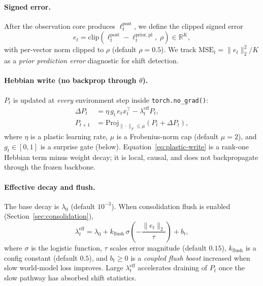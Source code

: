 \paragraph{Signed error.}
After the observation core produces $\ell^{\mathrm{post}}_t$, we define the clipped signed error
\begin{equation}
  e_t = \mathrm{clip}\!\left(\ell^{\mathrm{post}}_t - \ell^{\mathrm{prior,pl}}_t,\; \rho\right) \in \mathbb{R}^{K},
  \label{eq:signed-error}
\end{equation}
with per-vector norm clipped to $\rho$ (default $\rho=0.5$).
We track $\mathrm{MSE}_t = \|e_t\|_2^2 / K$ as a \emph{prior prediction error} diagnostic for shift detection.

\paragraph{Hebbian write (no backprop through $\theta$).}
$P_t$ is updated at \emph{every} environment step inside \texttt{torch.no\_grad()}:
\begin{align}
  \Delta P_t &= \eta \, g_t \, e_t x_t^\top - \lambda^{\mathrm{eff}}_t P_t,
  \label{eq:plastic-write}\\
  P_{t+1} &= \mathrm{Proj}_{\|\cdot\|_F \le \mu}\!\left(P_t + \Delta P_t\right),
  \label{eq:plastic-proj}
\end{align}
where $\eta$ is a plastic learning rate, $\mu$ is a Frobenius-norm cap (default $\mu=2$), and $g_t \in [0,1]$ is a surprise gate (below).
Equation~\eqref{eq:plastic-write} is a rank-one Hebbian term minus weight decay; it is local, causal, and does not backpropagate through the frozen backbone.

\paragraph{Effective decay and flush.}
The base decay is $\lambda_0$ (default $10^{-3}$).
When consolidation flush is enabled (Section~\ref{sec:consolidation}),
\begin{equation}
  \lambda^{\mathrm{eff}}_t = \lambda_0 + k_{\mathrm{flush}}\,\sigma\!\left(-\frac{\|e_t\|_2}{\tau}\right) + b_t,
  \label{eq:lambda-eff}
\end{equation}
where $\sigma$ is the logistic function, $\tau$ scales error magnitude (default $0.15$), $k_{\mathrm{flush}}$ is a config constant (default $0.5$), and $b_t \ge 0$ is a \emph{coupled flush boost} increased when slow world-model loss improves.
Large $\lambda^{\mathrm{eff}}_t$ accelerates draining of $P_t$ once the slow pathway has absorbed shift statistics.

